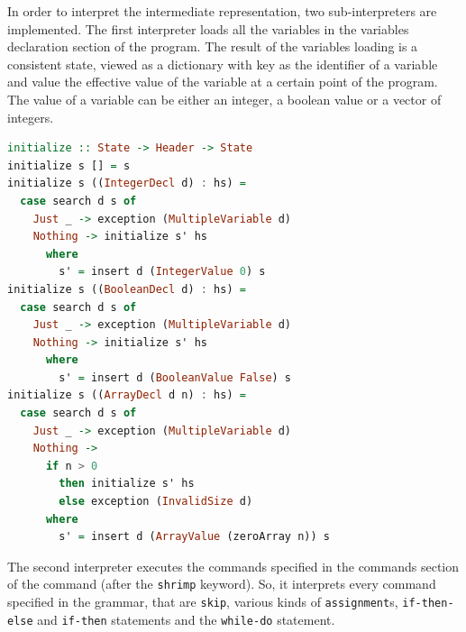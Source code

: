 \documentclass[12pt,a4paper]{article}
\begin{document}
In order to interpret the intermediate representation, two sub-interpreters are implemented.
The first interpreter loads all the variables in the variables declaration section of the program.
The result of the variables loading is a consistent state, viewed as a dictionary with key as the identifier of a variable and value the effective value of the variable at a certain point of the program.
The value of a variable can be either an integer, a boolean value or a vector of integers.
\begin{lstlisting}[language=Haskell, style=custom-style]
initialize :: State -> Header -> State
initialize s [] = s
initialize s ((IntegerDecl d) : hs) =
  case search d s of
    Just _ -> exception (MultipleVariable d)
    Nothing -> initialize s' hs
      where
        s' = insert d (IntegerValue 0) s
initialize s ((BooleanDecl d) : hs) =
  case search d s of
    Just _ -> exception (MultipleVariable d)
    Nothing -> initialize s' hs
      where
        s' = insert d (BooleanValue False) s
initialize s ((ArrayDecl d n) : hs) =
  case search d s of
    Just _ -> exception (MultipleVariable d)
    Nothing ->
      if n > 0
        then initialize s' hs
        else exception (InvalidSize d)
      where
        s' = insert d (ArrayValue (zeroArray n)) s
\end{lstlisting}
The second interpreter executes the commands specified in the commands section of the command (after the \texttt{shrimp} keyword).
So, it interprets every command specified in the grammar, that are \texttt{skip}, various kinds of \texttt{assignment}s, \texttt{if-then-else} and \texttt{if-then} statements and the \texttt{while-do} statement.
\end{document}
